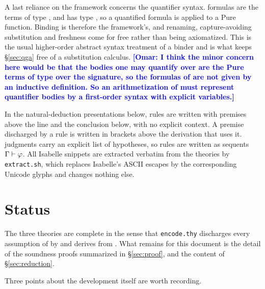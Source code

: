 \documentclass[11pt]{article}
\newcommand{\omar}[1]{\textcolor{blue}{\textbf{[Omar: #1]}}}
\begin{document}
A last reliance on the framework concerns the quantifier syntax.  \QGA{}
formulas are the terms of type , and  has type
, so a quantified formula is  applied to a Pure
function.  Binding is therefore the framework's, and renaming, capture-avoiding
substitution and freshness come for free rather than being axiomatized.  This is
the usual higher-order abstract syntax treatment of a binder and is what keeps
\S\ref{sec:qga} free of a substitution calculus. \omar{ I think the minor concern here would be that the bodies one
may quantify over are the Pure terms of type \isa{num ⇒ o} over the \QGA{}
signature, so the formulas of \QGA{} are not given by an inductive definition.
So an arithmetization of \QGA{} must
represent quantifier bodies by a first-order syntax with explicit variables.}

In the natural-deduction presentations below, \QGA{} rules are written with
premises above the line and the conclusion below, with no explicit context.  A
premise discharged by a rule is written in brackets above the derivation that
uses it.  \BGA{} judgments carry an explicit list of hypotheses, so \BGA{} rules
are written as sequents $\Gamma \vdash \varphi$.  All Isabelle snippets are
extracted verbatim from the theories by \texttt{extract.sh}, which replaces
Isabelle's ASCII escapes by the corresponding Unicode glyphs and changes nothing
else.








\section{Status}

The three theories are complete in the sense that \texttt{encode.thy}
discharges every assumption of  by  and
derives  from
.  What remains for this document is the
detail of the soundness proofs summarized in \S\ref{sec:proof}, and the content
of \S\ref{sec:reduction}.

Three points about the development itself are worth recording.
\end{document}

